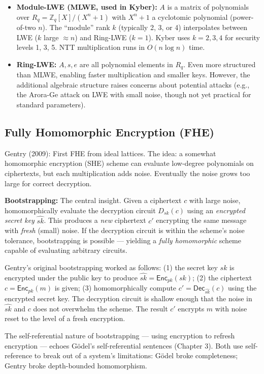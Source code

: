 \begin{itemize}
\item \textbf{Module-LWE (MLWE, used in Kyber):} $A$ is a matrix of polynomials over $R_q = \mathbb{Z}_q[X]/(X^n+1)$ with $X^n+1$ a cyclotomic polynomial (power-of-two $n$). The ``module'' rank $k$ (typically 2, 3, or 4) interpolates between LWE ($k$ large $\approx n$) and Ring-LWE ($k=1$). Kyber uses $k=2,3,4$ for security levels 1, 3, 5. NTT multiplication runs in $O(n \log n)$ time.
\item \textbf{Ring-LWE:} $A, s, e$ are all polynomial elements in $R_q$. Even more structured than MLWE, enabling faster multiplication and smaller keys. However, the additional algebraic structure raises concerns about potential attacks (e.g., the Arora-Ge attack on LWE with small noise, though not yet practical for standard parameters).
\end{itemize}

\subsection{Fully Homomorphic Encryption (FHE)}
\label{sec:crypto:fhe}

Gentry (2009): First FHE from ideal lattices. The idea: a somewhat homomorphic encryption (SHE) scheme can evaluate low-degree polynomials on ciphertexts, but each multiplication adds noise. Eventually the noise grows too large for correct decryption.

\textbf{Bootstrapping:} The central insight. Given a ciphertext $c$ with large noise, homomorphically evaluate the decryption circuit $D_{sk}(c)$ using an \emph{encrypted secret key} $\widehat{sk}$. This produces a \emph{new} ciphertext $c'$ encrypting the same message with \emph{fresh} (small) noise. If the decryption circuit is within the scheme's noise tolerance, bootstrapping is possible — yielding a \emph{fully homomorphic} scheme capable of evaluating arbitrary circuits.

Gentry's original bootstrapping worked as follows: (1) the secret key $sk$ is encrypted under the public key to produce $\widehat{sk} = \mathsf{Enc}_{pk}(sk)$; (2) the ciphertext $c = \mathsf{Enc}_{pk}(m)$ is given; (3) homomorphically compute $c' = \mathsf{Dec}_{\widehat{sk}}(c)$ using the encrypted secret key. The decryption circuit is shallow enough that the noise in $\widehat{sk}$ and $c$ does not overwhelm the scheme. The result $c'$ encrypts $m$ with noise reset to the level of a fresh encryption.

The self-referential nature of bootstrapping — using encryption to refresh encryption — echoes Gödel's self-referential sentences (Chapter 3). Both use self-reference to break out of a system's limitations: Gödel broke completeness; Gentry broke depth-bounded homomorphism.


